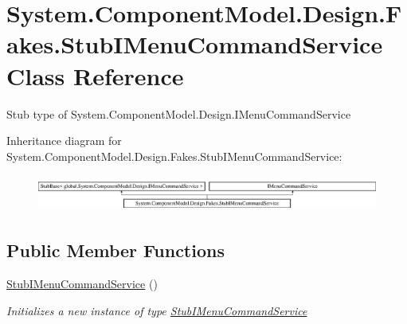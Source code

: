 \hypertarget{class_system_1_1_component_model_1_1_design_1_1_fakes_1_1_stub_i_menu_command_service}{\section{System.\-Component\-Model.\-Design.\-Fakes.\-Stub\-I\-Menu\-Command\-Service Class Reference}
\label{class_system_1_1_component_model_1_1_design_1_1_fakes_1_1_stub_i_menu_command_service}
}


Stub type of System.\-Component\-Model.\-Design.\-I\-Menu\-Command\-Service 


Inheritance diagram for System.\-Component\-Model.\-Design.\-Fakes.\-Stub\-I\-Menu\-Command\-Service\-:\begin{figure}[H]
\begin{center}
\leavevmode
\includegraphics[height=1.222707cm]{class_system_1_1_component_model_1_1_design_1_1_fakes_1_1_stub_i_menu_command_service}
\end{center}
\end{figure}
\subsection*{Public Member Functions}
\begin{DoxyCompactItemize}
\item 
\hyperlink{class_system_1_1_component_model_1_1_design_1_1_fakes_1_1_stub_i_menu_command_service_a590b8ba2855b823301de46bcfd2cdc9e}{Stub\-I\-Menu\-Command\-Service} ()
\begin{DoxyCompactList}\small\item\em Initializes a new instance of type \hyperlink{class_system_1_1_component_model_1_1_design_1_1_fakes_1_1_stub_i_menu_command_service}{Stub\-I\-Menu\-Command\-Service}\end{DoxyCompactList}\end{DoxyCompactItemize}
